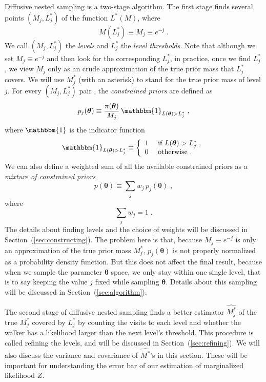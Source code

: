 \documentclass[letterpaper, preprint]{aastex}
\newcommand{\bth} {\boldsymbol \theta}
\begin{document}
Diffusive nested sampling is a two-stage algorithm. The first stage finds several points $(M_j, L^*_j)$ of the function $L^*(M)$, where
\begin{equation}
M(L^*_j) \equiv M_j \equiv e^{-j}\; .
\end{equation}
We call $(M_j, L^*_j)$ the {\em levels} and $L^*_j$ the {\em level thresholds}. Note that although we set $M_j \equiv e^{-j}$ and then look for the corresponding $L^*_j$, in practice, once we find $L^*_j$, we view $M_j$ only as an crude approximation of the true prior mass that $L^*_j$ covers. We will use $M^*_j$ (with an asterisk) to stand for the true prior mass of level $j$. For every $(M_j, L^*_j)$ pair , the {\em constrained priors} are defined as
\begin{equation} 
p_{j}(\bth) \equiv \frac{\pi(\bth)}{M_j}\,\mathbbm{1}_{L(\bth)>L_j^*} \; ,
\label{eq:constrained-prior}
\end{equation}
where $\mathbbm{1}$ is the indicator function
\begin{eqnarray}
\mathbbm{1}_{L(\bth)>L_j^*} \equiv \left\{ \begin{array}{ll}
               1 & \mbox{ if } L(\bth)>L_j^*\; ,\\
               0 & \mbox{ otherwise .} \end{array}\right.
\end{eqnarray}
We can also define a weighted sum of all the available constrained priors as a {\em mixture of constrained priors}
\begin{equation}
p(\bth) \equiv \sum_{j} w_j\,p_{j}(\bth) \; ,
\end{equation}
where 
\begin{equation}
\sum_j w_j = 1 \; .
\end{equation}
The details about finding levels and the choice of weights will be discussed in Section~(\ref{sec:constructing}). The problem here is that, because $M_j \equiv e^{-j}$ is only an approximation of the true prior mass $M^*_j$, $p_j(\bth)$ is not properly normalized as a probability density function. But this does not affect the final result, because when we sample the parameter $\bth$ space, we only stay within one single level, that is to say keeping the value $j$ fixed while sampling $\bth$. Details about this sampling will be discussed in Section~(\ref{sec:algorithm}). 

The second stage of diffusive nested sampling finds a better estimator $\widehat{M^*_j}$ of the true $M^*_j$ covered by $L^*_j$ by counting the visits to each level and whether the walker has a likelihood larger than the next level's threshold. This procedure is called refining the levels, and will be discussed in Section~(\ref{sec:refining}). We will also discuss the variance and covariance of $\widehat{M^*}$'s in this section. These will be important for understanding the error bar of our estimation of marginalized likelihood $Z$.
\end{document}
